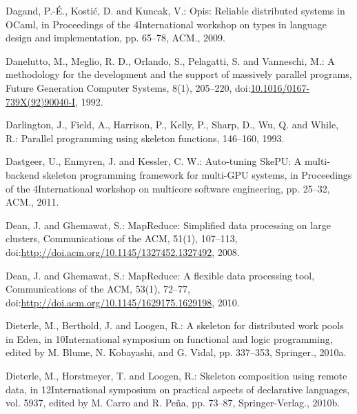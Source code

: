 \documentclass[paper=A4,twoside=true,openright,parskip=full,chapterprefix=true,headings=normal,bibliography=totoc,listof=totoc,titlepage=on,captions=tableabove,draft=false,british]{scrreprt}%
\begin{document}
\leavevmode\hypertarget{ref-Dagand:2009:ORD:1481861.1481870}{}%
Dagand, P.-É., Kostić, D. and Kuncak, V.: Opis: Reliable distributed
systems in OCaml, in Proceedings of the 4International workshop on types
in language design and implementation, pp. 65--78, ACM., 2009.

\leavevmode\hypertarget{ref-DANELUTTO1992205}{}%
Danelutto, M., Meglio, R. D., Orlando, S., Pelagatti, S. and Vanneschi,
M.: A methodology for the development and the support of massively
parallel programs, Future Generation Computer Systems, 8(1), 205--220,
doi:\href{https://doi.org/10.1016/0167-739X(92)90040-I}{10.1016/0167-739X(92)90040-I},
1992.

\leavevmode\hypertarget{ref-darlington1993parallel}{}%
Darlington, J., Field, A., Harrison, P., Kelly, P., Sharp, D., Wu, Q.
and While, R.: Parallel programming using skeleton functions, 146--160,
1993.

\leavevmode\hypertarget{ref-Dastgeer:2011:ASM:1984693.1984697}{}%
Dastgeer, U., Enmyren, J. and Kessler, C. W.: Auto-tuning SkePU: A
multi-backend skeleton programming framework for multi-GPU systems, in
Proceedings of the 4International workshop on multicore software
engineering, pp. 25--32, ACM., 2011.

\leavevmode\hypertarget{ref-Dean:2008:MSD:1327452.1327492}{}%
Dean, J. and Ghemawat, S.: MapReduce: Simplified data processing on
large clusters, Communications of the ACM, 51(1), 107--113,\linebreak
doi:\href{https://doi.org/http://doi.acm.org/10.1145/1327452.1327492}{http://doi.acm.org/10.1145/1327452.1327492},
2008.

\leavevmode\hypertarget{ref-Dean:2010:MFD:1629175.1629198}{}%
Dean, J. and Ghemawat, S.: MapReduce: A flexible data processing tool,
Communications of the ACM, 53(1), 72--77,
doi:\href{https://doi.org/http://doi.acm.org/10.1145/1629175.1629198}{http://doi.acm.org/10.1145/1629175.1629198},
2010.

\leavevmode\hypertarget{ref-dieterle2010skeleton}{}%
Dieterle, M., Berthold, J. and Loogen, R.: A skeleton for distributed
work pools in Eden, in 10International symposium on functional and logic
programming, edited by M. Blume, N. Kobayashi, and G. Vidal, pp.
337--353, Springer., 2010a.

\leavevmode\hypertarget{ref-Dieterle2010}{}%
Dieterle, M., Horstmeyer, T. and Loogen, R.: Skeleton composition using
remote data, in 12International symposium on practical aspects of
declarative languages, vol. 5937, edited by M. Carro and R. Peña, pp.
73--87, Springer-Verlag., 2010b.
\end{document}
